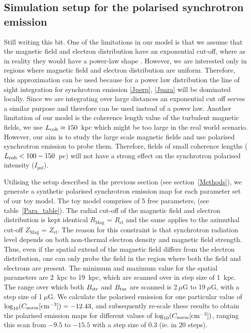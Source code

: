 \documentclass[usenatbib]{mnras}
\newcommand{\Vasu}[1]{{\color{purple}#1}}
\begin{document}
\subsection{Simulation setup for the polarised synchrotron emission}
\Vasu{Still writing this bit.}
One of the limitations in our model is that we assume that the magnetic field and electron distribution have an exponential cut-off, where as in reality they would have a power-law shape \cite{Drury_2012} \cite{Hammurabi} \cite{Eck_2015}. However, we are interested only in regions where magnetic field and electron distribution are uniform. Therefore, this approximation can be used because for a power law distribution the line of sight integration for synchrotron emission \ref{Jperp}, \ref{Jpara} will be dominated locally. 
Since we are integrating over large distances an exponential cut off serves a similar purpose and therefore can be used instead of a power law. 
Another limitation of our model is the coherence length value of the turbulent magnetic fields, we use $L_{\rm coh} \approx 150$~kpc which might be too large in the real world scenario. However, our aim is to study the large scale magnetic fields and use polarised synchrotron emission to probe them. Therefore, fields of small coherence lengths ($L_{\rm coh} < 100 - 150 $~pc) will not have a strong effect on the synchrotron polarised intensity ($I_{pol}$). 

Utilising the setup described in the previous section (see section~\ref{Methods}), we generate a synthetic polarised synchrotron emission map for each parameter set of our toy model. The toy model comprises of 5 free parameters, (see table~\ref{Para_table}). The radial cut-off of the magnetic field and electron distribution is kept identical $R_{\mathrm{Mag}}$ = $R_{\mathrm{el}}$ and the same applies to the azimuthal cut-off $Z_{\mathrm{Mag}}$ = $Z_{\mathrm{el}}$. The reason for this constraint is that synchrotron radiation level depends on both non-thermal electron density and magnetic field strength. Thus, even if the spatial extend of the magnetic field differs from the electron distribution, one can only probe the field in the region where both the field and electrons are present. The minimum and maximum value for the spatial parameters are 2~kpc to 19~kpc, which are scanned over in step size of 1~kpc. The range over which both $B_{\rm str}$ and $B_{\rm tur}$ are scanned is 2$~\mu$G to 19$~\mu$G, with a step size of 1$~\mu$G. We calculate the polarised emission for one particular value of $\log_{10}(C_{\rm norm}[{\rm cm}^{-3}]) = -12.43$, and subsequently re-scale these results to obtain the polarised emission maps for different values of  $\log_{10}(C_{\rm norm} [{\rm cm}^{-3}])$, ranging this scan from $-9.5$ to $-15.5$ with a step size of $0.3$ (ie. in 20 steps).%
\end{document}
